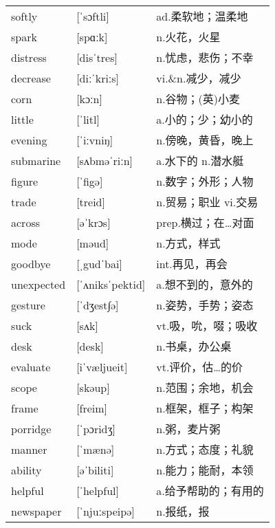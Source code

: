 \documentclass[a4paper]{article}
\begin{document}
\section{}
\begin{tabular}{l l l}

softly & [ˈsɔftli] & ad.柔软地；温柔地 \\
spark & [spɑːk] & n.火花，火星 \\
distress & [disˈtres] & n.忧虑，悲伤；不幸 \\
decrease & [diːˈkriːs] & vi.\&n.减少，减少 \\
corn & [kɔːn] & n.谷物；(英)小麦 \\
little & [ˈlitl] & a.小的；少；幼小的 \\
evening & [ˈiːvniŋ] & n.傍晚，黄昏，晚上 \\
submarine & [sʌbməˈriːn] & a.水下的 n.潜水艇 \\
figure & [ˈfigə] & n.数字；外形；人物 \\
trade & [treid] & n.贸易；职业 vi.交易 \\
across & [əˈkrɔs] & prep.横过；在…对面 \\
mode & [məud] & n.方式，样式 \\
goodbye & [ˌgudˈbai] & int.再见，再会 \\
unexpected & [ˈʌniksˈpektid] & a.想不到的，意外的 \\
gesture & [ˈdʒest∫ə] & n.姿势，手势；姿态 \\
suck & [sʌk] & vt.吸，吮，啜；吸收 \\
desk & [desk] & n.书桌，办公桌 \\
evaluate & [iˈvæljueit] & vt.评价，估…的价 \\
scope & [skəup] & n.范围；余地，机会 \\
frame & [freim] & n.框架，框子；构架 \\
porridge & [ˈpɔridʒ] & n.粥，麦片粥 \\
manner & [ˈmænə] & n.方式；态度；礼貌 \\
ability & [əˈbiliti] & n.能力；能耐，本领 \\
helpful & [ˈhelpful] & a.给予帮助的；有用的 \\
newspaper & [ˈnjuːspeipə] & n.报纸，报 \\

\end{tabular}
\end{document}
